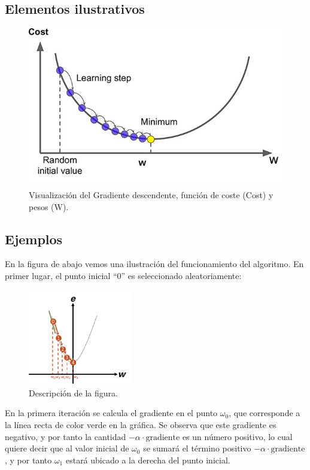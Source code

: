 \documentclass[conference]{IEEEtran}
\begin{document}
\subsection{Elementos ilustrativos}

\newpage %
\begin{figure}[t] %
\centering
\includegraphics[width=0.9\columnwidth]{gradiente.jpg}
\caption{Visualización del Gradiente descendente, función de coste (Cost) y pesos (W).}
\label{fig:ejemplo}
\end{figure}

\newpage
\subsection{Ejemplos}
En la figura de abajo vemos una ilustración del funcionamiento del algoritmo. En primer lugar, el punto inicial “0” es seleccionado aleatoriamente:

\begin{figure}[htbp]
\centering
\includegraphics[width=0.4\textwidth]{ej1.png}
\caption{Descripción de la figura.}
\label{fig:ejemplo}
\end{figure}

En la primera iteración se calcula el gradiente en el punto $\omega_0$, que corresponde a la línea recta de color verde en la gráfica. Se observa que este gradiente es negativo, y por tanto la cantidad $-\alpha \cdot \text{gradiente}$ es un número positivo, lo cual quiere decir que al valor inicial de $\omega_0$ se sumará el término positivo $-\alpha \cdot \text{gradiente}$, y por tanto $\omega_1$ estará ubicado a la derecha del punto inicial.
\end{document}
